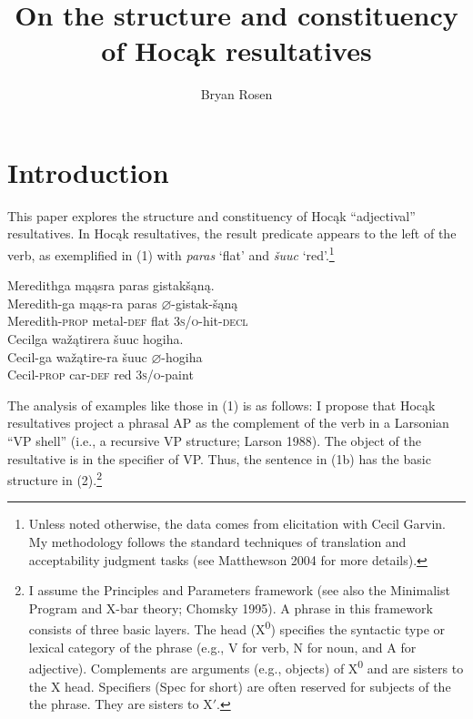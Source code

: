 \documentclass[output=paper]{LSP/langsci}
\author{Bryan Rosen}
\title{On the structure and constituency of Hocąk resultatives}
\begin{document}
\section{Introduction}

This paper explores the structure and constituency of Hocąk ``adjectival'' resultatives. In Hocąk resultatives, the result predicate appears to the left of the verb, as exemplified in (1) with \textit{paras} `flat' and \textit{šuuc} `red'.\footnote{Unless noted otherwise, the data comes from  elicitation with Cecil Garvin. My methodology follows the standard techniques of translation and acceptability judgment tasks (see Matthewson 2004 for more details).}

\ea
\ea
\glll Meredithga mąąsra paras gistakšąną. \\
 Meredith-ga mąąs-ra paras {$\varnothing$}-gistak-šąną\\
Meredith-\textsc{prop} metal-\textsc{def} flat  \textsc{3s/o}-hit-\textsc{decl}\\

\ex 
\glll Cecilga wažątirera šuuc hogiha. \\
Cecil-ga  wažątire-ra šuuc {$\varnothing$}-hogiha \\
Cecil-\textsc{prop} car-\textsc{def} red \textsc{3s/o}-paint\\
\z
\z


The analysis of examples like those in (1) is as follows: I propose that Hocąk resultatives project a phrasal AP as the complement of the verb in a Larsonian ``VP shell'' (i.e., a recursive VP structure; Larson 1988). The object of the resultative is in the specifier of VP. Thus, the sentence in (1b) has the basic structure in (2).\footnote{I assume the Principles and Parameters framework (see also the Minimalist Program and X-bar theory; Chomsky 1995). A phrase in this framework consists of three basic layers. The head (X\textsuperscript{0}) specifies the syntactic type or lexical category of the phrase (e.g., V for verb, N for noun, and A for adjective). Complements are arguments (e.g., objects) of X\textsuperscript{0} and are sisters to the X head. Specifiers (Spec for short) are often reserved for subjects of the the phrase. They are sisters to X$'$.}
\begin{exe}
\ex

{\hspace{1em}}\newline
{}
\end{exe}
\end{document}
